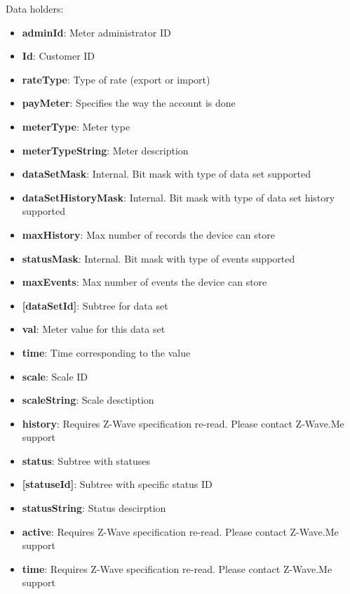 \noindent
Data holders:

\begin{itemize}
\item \textbf{adminId}: Meter administrator ID
\item \textbf{Id}: Customer ID
\item \textbf{rateType}: Type of rate (export or import)
\item \textbf{payMeter}: Specifies the way the account is done
\item \textbf{meterType}: Meter type
\item \textbf{meterTypeString}: Meter description
\item \textbf{dataSetMask}: Internal. Bit mask with type of data set supported
\item \textbf{dataSetHistoryMask}: Internal. Bit mask with type of data set history supported
\item \textbf{maxHistory}: Max number of records the device can store
\item \textbf{statusMask}: Internal. Bit mask with type of events supported
\item \textbf{maxEvents}: Max number of events the device can store
\item \textbf{[dataSetId]}: Subtree for data set
\item \qquad\textbf{val}: Meter value for this data set
\item \qquad\textbf{time}: Time corresponding to the value
\item \qquad\textbf{scale}: Scale ID
\item \qquad\textbf{scaleString}: Scale desctiption
\item \qquad\textbf{history}: Requires Z-Wave specification re-read. Please contact Z-Wave.Me support
\item \textbf{status}: Subtree with statuses
\item \qquad\textbf{[statuseId]}: Subtree with specific status ID
\item \qquad\qquad\textbf{statusString}: Status descirption
\item \qquad\qquad\textbf{active}: Requires Z-Wave specification re-read. Please contact Z-Wave.Me support
\item \qquad\qquad\textbf{time}: Requires Z-Wave specification re-read. Please contact Z-Wave.Me support
\end{itemize}

